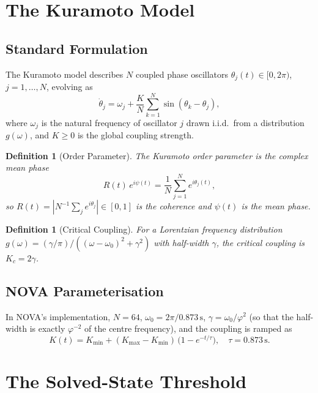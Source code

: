 \documentclass[12pt]{article}
\newtheorem{definition}[theorem]{Definition}
\newcommand{\PHI}{\varphi}
\newcommand{\AMOR}{\varphi^{-2}}
\newcommand{\Kc}{K}
\begin{document}
\section{The Kuramoto Model}
\label{sec:kuramoto}

\subsection{Standard Formulation}

The Kuramoto model describes $N$ coupled phase oscillators
$\theta_j(t) \in [0, 2\pi)$, $j = 1, \ldots, N$, evolving as
\begin{equation}
  \label{eq:kuramoto}
  \dot{\theta}_j = \omega_j + \frac{\Kc}{N}\sum_{k=1}^{N}\sin(\theta_k - \theta_j),
\end{equation}
where $\omega_j$ is the natural frequency of oscillator $j$ drawn i.i.d.\ from
a distribution $g(\omega)$, and $\Kc \ge 0$ is the global coupling strength.

\begin{definition}[Order Parameter]
The \emph{Kuramoto order parameter} is the complex mean phase
\[
  R(t)\,e^{i\psi(t)} = \frac{1}{N}\sum_{j=1}^{N} e^{i\theta_j(t)},
\]
so $R(t) = |N^{-1}\sum_j e^{i\theta_j}| \in [0, 1]$ is the coherence and
$\psi(t)$ is the mean phase.
\end{definition}

\begin{definition}[Critical Coupling]
\label{def:Kc}
For a Lorentzian frequency distribution $g(\omega) = (\gamma/\pi)/((\omega -
\omega_0)^2 + \gamma^2)$ with half-width $\gamma$, the critical coupling is
$K_c = 2\gamma$.
\end{definition}

\subsection{NOVA Parameterisation}

In NOVA's implementation, $N = 64$, $\omega_0 = 2\pi/0.873\,\mathrm{s}$,
$\gamma = \omega_0 / \PHI^2$ (so that the half-width is exactly $\AMOR$ of the
centre frequency), and the coupling is ramped as
\[
  K(t) = K_{\min} + (K_{\max} - K_{\min})\,\bigl(1 - e^{-t/\tau}\bigr),
  \quad \tau = 0.873\,\mathrm{s}.
\]

\section{The Solved-State Threshold}
\label{sec:threshold}
\end{document}
